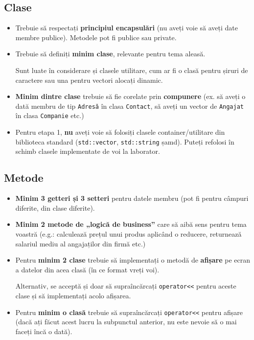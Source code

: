 \subsection*{Clase}

\begin{itemize}
    \item Trebuie să respectați \textbf{principiul encapsulări} (nu aveți voie să aveți date membre publice). Metodele pot fi publice sau private.

    \item Trebuie să definiți \textbf{minim \phaseoneminimumnumberofclasses{} clase}, relevante pentru tema aleasă.
    
    Sunt luate în considerare și clasele utilitare, cum ar fi o clasă pentru șiruri de caractere sau una pentru vectori alocați dinamic.

    \item \textbf{Minim \phaseoneminimumnumberofcompositions{} dintre clase} trebuie să fie corelate prin \textbf{compunere} (ex. să aveți o dată membru de tip \texttt{Adresă} în clasa \texttt{Contact}, să aveți un vector de \texttt{Angajat} în clasa \texttt{Companie} etc.) 

    \item Pentru etapa 1, \textbf{nu} aveți voie să folosiți clasele container/utilitare din biblioteca standard (\texttt{std::vector}, \texttt{std::string} șamd). Puteți refolosi în schimb clasele implementate de voi la laborator.
\end{itemize}

\subsection*{Metode}

\begin{itemize}
    \item \textbf{Minim 3 getteri și 3 setteri} pentru datele membru (pot fi pentru câmpuri diferite, din clase diferite).

    \item \textbf{Minim 2 metode de „logică de business”} care să aibă sens pentru tema voastră (e.g.: calculează prețul unui produs aplicând o reducere, returnează salariul mediu al angajaților din firmă etc.)

    \item Pentru \textbf{minim 2 clase} trebuie să implementați o metodă de \textbf{afișare} pe ecran a datelor din acea clasă (în ce format vreți voi).
    
    Alternativ, se acceptă și doar să supraîncărcați \texttt{operator<<} pentru aceste clase și să implementați acolo afișarea.

    \item Pentru \textbf{minim o clasă} trebuie să supraîncărcați \texttt{operator<<} pentru afișare (dacă ați făcut acest lucru la subpunctul anterior, nu este nevoie să o mai faceți încă o dată).
\end{itemize}

